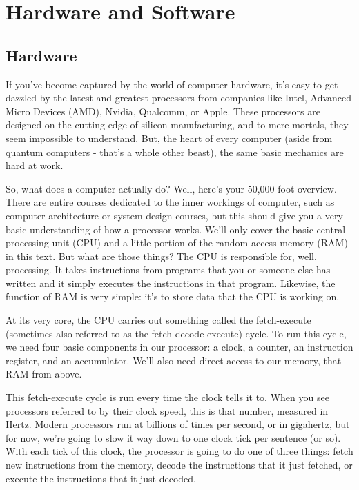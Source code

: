 \section{Hardware and Software}
\subsection{Hardware}
If you've become captured by the world of computer hardware, it's easy to get dazzled by the latest and greatest processors from companies like Intel, Advanced Micro Devices (AMD), Nvidia, Qualcomm, or Apple. These processors are designed on the cutting edge of silicon manufacturing, and to mere mortals, they seem impossible to understand. But, the heart of every computer (aside from quantum computers - that's a whole other beast), the same basic mechanics are hard at work.\par
So, what does a computer actually do? Well, here's your 50,000-foot overview. There are entire courses dedicated to the inner workings of computer, such as computer architecture or system design courses, but this should give you a very basic understanding of how a processor works. We'll only cover the basic central processing unit (CPU) and a little portion of the random access memory (RAM) in this text. But what are those things? The CPU is responsible for, well, processing. It takes instructions from programs that you or someone else has written and it simply executes the instructions in that program. Likewise, the function of RAM is very simple: it's to store data that the CPU is working on.\par
{}
At its very core, the CPU carries out something called the fetch-execute (sometimes also referred to as the fetch-decode-execute) cycle. To run this cycle, we need four basic components in our processor: a clock, a counter, an instruction register, and an accumulator. We'll also need direct access to our memory, that RAM from above.\par
This fetch-execute cycle is run every time the clock tells it to. When you see processors referred to by their clock speed, this is that number, measured in Hertz. Modern processors run at billions of times per second, or in gigahertz, but for now, we're going to slow it way down to one clock tick per sentence (or so). With each tick of this clock, the processor is going to do one of three things: fetch new instructions from the memory, decode the instructions that it just fetched, or execute the instructions that it just decoded.
